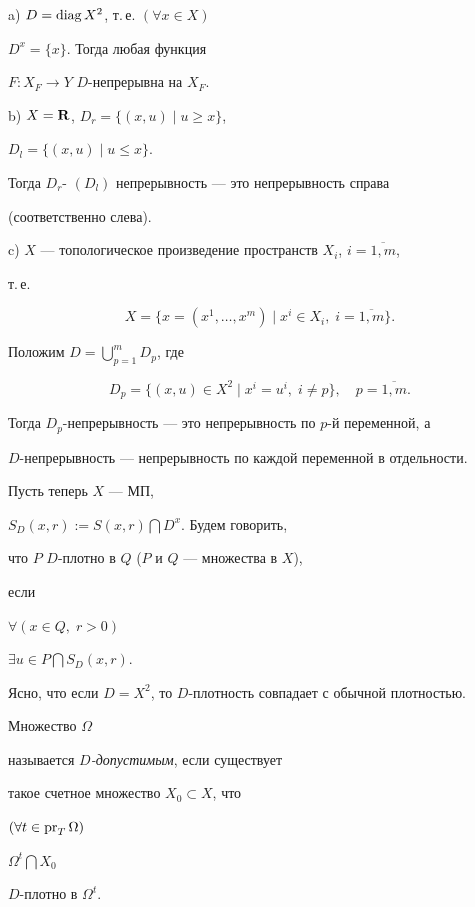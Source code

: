 a) $D=\operatorname{diag} X^2$, т.\,е. $(\forall x\in X)$


$D^x=\{x\}$. Тогда любая функция


$F:X_F\to Y$ \; $D$-непрерывна на $X_F$.





b) $X=\bold R$, $D_r=\{(x,u)\mid u\ge x\}$, 


$D_l=\{(x,u)\mid u\le x\}$.


Тогда $D_r$- $(D_l)$ непрерывность --- это непрерывность справа


(соответственно слева).





c) $X$ --- топологическое произведение пространств $X_i$, $i=\overline{1,m}$,


т.\,е.


$$


X = \{x=(x^1,\dotsc,x^m)\mid x^i\in X_i, \; i=\overline{1,m}\}.


$$


Положим $D=\bigcup\limits_{p=1}^m D_p$, где


$$


D_p=\{(x,u)\in X^2\mid x^i=u^i, \; i\ne p\}, \quad p=\overline{1,m}.


$$


Тогда $D_p$-непрерывность --- это непрерывность по $p$-й переменной, а


$D$-непрерывность --- непрерывность по каждой переменной в отдельности.





Пусть теперь $X$ --- МП,


$S_D(x,r):=S(x,r)\bigcap D^x$. Будем говорить,


что $P$ \; $D$-плотно в $Q$ ($P$ и $Q$ --- множества в $X$),


если


$\forall (x\in Q,\; r>0)$


$\exists u\in P\bigcap S_D(x,r)$.


Ясно, что если $D=X^2$, то $D$-плотность совпадает с обычной плотностью.





\begin{defns} Множество $\Omega$


называется {\em $D$-допустимым}, если существует


такое счетное множество $X_0\subset X$, что


$(\forall t\in\operatorname{pr}_T\Omega)$ \;


$\Omega^t\bigcap X_0$ \;


$D$-плотно в $\Omega^t$.


\end{defns}





